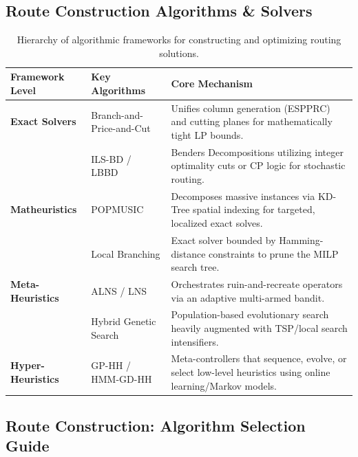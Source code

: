 \documentclass{article}
\begin{document}

\subsection*{Route Construction Algorithms \& Solvers}

\begin{table}[H]
    \centering
    \caption{Hierarchy of algorithmic frameworks for constructing and optimizing routing solutions.}
    \begin{tabularx}{\textwidth}{@{} l l X @{}}
        \toprule
        \textbf{Framework Level} & \textbf{Key Algorithms} & \textbf{Core Mechanism} \\
        \midrule
        \textbf{Exact Solvers} & Branch-and-Price-and-Cut & Unifies column generation (ESPPRC) and cutting planes for mathematically tight LP bounds. \\
        & ILS-BD / LBBD & Benders Decompositions utilizing integer optimality cuts or CP logic for stochastic routing. \\
        \textbf{Matheuristics} & POPMUSIC & Decomposes massive instances via KD-Tree spatial indexing for targeted, localized exact solves. \\
        & Local Branching & Exact solver bounded by Hamming-distance constraints to prune the MILP search tree. \\
        \textbf{Meta-Heuristics} & ALNS / LNS & Orchestrates ruin-and-recreate operators via an adaptive multi-armed bandit. \\
        & Hybrid Genetic Search & Population-based evolutionary search heavily augmented with TSP/local search intensifiers. \\
        \textbf{Hyper-Heuristics} & GP-HH / HMM-GD-HH & Meta-controllers that sequence, evolve, or select low-level heuristics using online learning/Markov models. \\
        \bottomrule
    \end{tabularx}
\end{table}

\subsection*{Route Construction: Algorithm Selection Guide}
\end{document}
